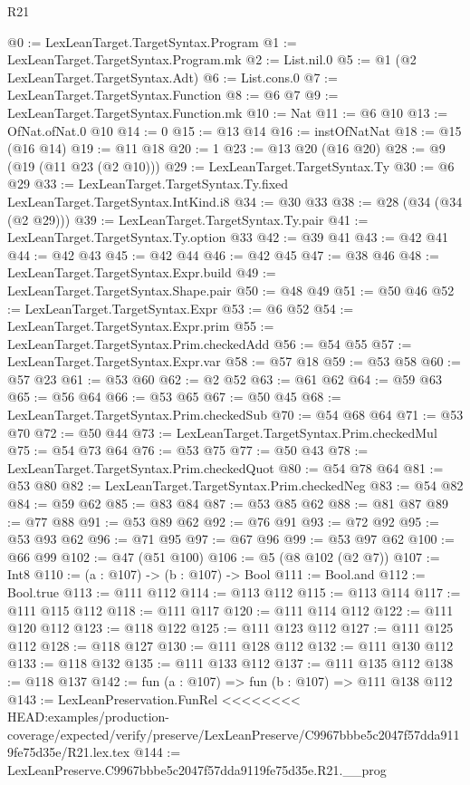 \begin{lexlean}{R21}
\begin{coremodule}
{{{{{@0 := LexLeanTarget.TargetSyntax.Program
@1 := LexLeanTarget.TargetSyntax.Program.mk
@2 := List.nil.{0}
@5 := @1 (@2 LexLeanTarget.TargetSyntax.Adt)
@6 := List.cons.{0}
@7 := LexLeanTarget.TargetSyntax.Function
@8 := @6 @7
@9 := LexLeanTarget.TargetSyntax.Function.mk
@10 := Nat
@11 := @6 @10
@13 := OfNat.ofNat.{0} @10
@14 := 0
@15 := @13 @14
@16 := instOfNatNat
@18 := @15 (@16 @14)
@19 := @11 @18
@20 := 1
@23 := @13 @20 (@16 @20)
@28 := @9 (@19 (@11 @23 (@2 @10)))
@29 := LexLeanTarget.TargetSyntax.Ty
@30 := @6 @29
@33 := LexLeanTarget.TargetSyntax.Ty.fixed LexLeanTarget.TargetSyntax.IntKind.i8
@34 := @30 @33
@38 := @28 (@34 (@34 (@2 @29)))
@39 := LexLeanTarget.TargetSyntax.Ty.pair
@41 := LexLeanTarget.TargetSyntax.Ty.option @33
@42 := @39 @41
@43 := @42 @41
@44 := @42 @43
@45 := @42 @44
@46 := @42 @45
@47 := @38 @46
@48 := LexLeanTarget.TargetSyntax.Expr.build
@49 := LexLeanTarget.TargetSyntax.Shape.pair
@50 := @48 @49
@51 := @50 @46
@52 := LexLeanTarget.TargetSyntax.Expr
@53 := @6 @52
@54 := LexLeanTarget.TargetSyntax.Expr.prim
@55 := LexLeanTarget.TargetSyntax.Prim.checkedAdd
@56 := @54 @55
@57 := LexLeanTarget.TargetSyntax.Expr.var
@58 := @57 @18
@59 := @53 @58
@60 := @57 @23
@61 := @53 @60
@62 := @2 @52
@63 := @61 @62
@64 := @59 @63
@65 := @56 @64
@66 := @53 @65
@67 := @50 @45
@68 := LexLeanTarget.TargetSyntax.Prim.checkedSub
@70 := @54 @68 @64
@71 := @53 @70
@72 := @50 @44
@73 := LexLeanTarget.TargetSyntax.Prim.checkedMul
@75 := @54 @73 @64
@76 := @53 @75
@77 := @50 @43
@78 := LexLeanTarget.TargetSyntax.Prim.checkedQuot
@80 := @54 @78 @64
@81 := @53 @80
@82 := LexLeanTarget.TargetSyntax.Prim.checkedNeg
@83 := @54 @82
@84 := @59 @62
@85 := @83 @84
@87 := @53 @85 @62
@88 := @81 @87
@89 := @77 @88
@91 := @53 @89 @62
@92 := @76 @91
@93 := @72 @92
@95 := @53 @93 @62
@96 := @71 @95
@97 := @67 @96
@99 := @53 @97 @62
@100 := @66 @99
@102 := @47 (@51 @100)
@106 := @5 (@8 @102 (@2 @7))
@107 := Int8
@110 := (a : @107) -> (b : @107) -> Bool
@111 := Bool.and
@112 := Bool.true
@113 := @111 @112
@114 := @113 @112
@115 := @113 @114
@117 := @111 @115 @112
@118 := @111 @117
@120 := @111 @114 @112
@122 := @111 @120 @112
@123 := @118 @122
@125 := @111 @123 @112
@127 := @111 @125 @112
@128 := @118 @127
@130 := @111 @128 @112
@132 := @111 @130 @112
@133 := @118 @132
@135 := @111 @133 @112
@137 := @111 @135 @112
@138 := @118 @137
@142 := fun (a : @107) => fun (b : @107) => @111 @138 @112
@143 := LexLeanPreservation.FunRel
<<<<<<<< HEAD:examples/production-coverage/expected/verify/preserve/LexLeanPreserve/C9967bbbe5c2047f57dda9119fe75d35e/R21.lex.tex
@144 := LexLeanPreserve.C9967bbbe5c2047f57dda9119fe75d35e.R21.__prog
}}}}}
\end{coremodule}
\end{lexlean}
